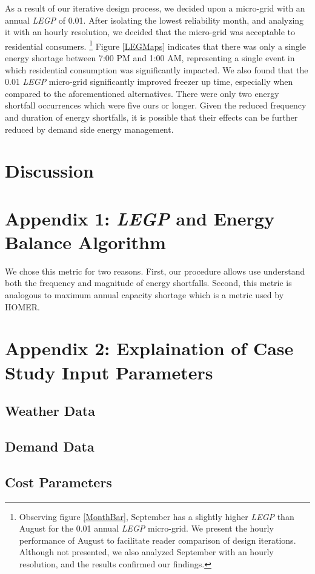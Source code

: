 \documentclass{article}
\begin{document}
As a result of our iterative design process, we decided upon a micro-grid with an annual \emph{LEGP} of 0.01. After isolating the lowest reliability month, and analyzing it with an hourly resolution, we decided that the micro-grid was acceptable to residential consumers. 
%
%
\footnote{Observing figure \ref{MonthBar}, September has a slightly higher \emph{LEGP} than August for the 0.01 annual \emph{LEGP} micro-grid. 
We present the hourly performance of August to facilitate reader comparison of design iterations. 
Although not presented, we also analyzed September with an hourly resolution, and the results confirmed our findings.}
%
%
%
Figure \ref{LEGMaps} indicates that there was only a single energy shortage between 7:00 PM and 1:00 AM, representing a single event in which residential consumption was significantly impacted.
We also found that the 0.01 \emph{LEGP} micro-grid significantly improved freezer up time, especially when compared to the aforementioned alternatives. There were only two energy shortfall occurrences which were five ours or longer. 
Given the reduced frequency and duration of energy shortfalls, it is possible that their effects can be further reduced by demand side energy management.

\section{Discussion}

\appendix	
\section{Appendix 1: \emph{LEGP} and Energy Balance Algorithm} \label{A1}

We chose this metric for two reasons.
First, our procedure allows use understand both the frequency and magnitude of energy shortfalls. 
Second, this metric is analogous to maximum annual capacity shortage which is a metric used by HOMER.


\section{Appendix 2: Explaination of Case Study Input Parameters} \label{A2}

\subsection{Weather Data}
\subsection{Demand Data}
\subsection{Cost Parameters}

\begin{thebibliography}{9}


\end{thebibliography}
\end{document}
